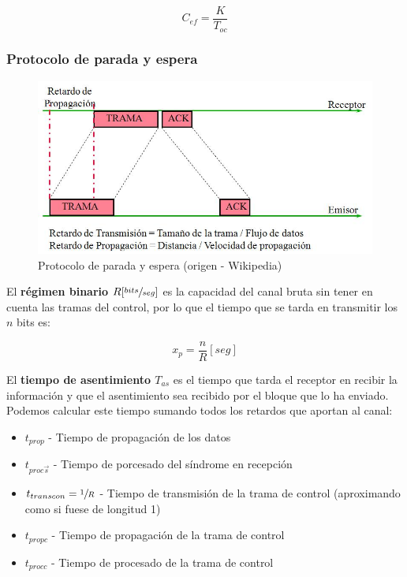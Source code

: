 \documentclass{article}
\begin{document}
\begin{equation}
    C_{ef} = \frac{K}{T_{oc}}
\end{equation}

\subsubsection{Protocolo de parada y espera}


\begin{figure}[h]
    \includegraphics[width=\textwidth]{img/pe.jpeg}
    \caption{Protocolo de parada y espera (origen - Wikipedia)}
\end{figure}


El \textbf{régimen binario $R [\sfrac{bits}{seg}]$} es la capacidad del canal bruta sin tener en cuenta las tramas del control, por lo que el tiempo que se tarda en transmitir los $n$ bits es:

\begin{equation}
    x_p = \frac{n}{R} [seg]
\end{equation}

El \textbf{tiempo de asentimiento $T_{as}$} es el tiempo que tarda el receptor en recibir la información y que el asentimiento sea recibido por el bloque que lo ha enviado. Podemos calcular este tiempo sumando todos los retardos que aportan al canal:

\begin{itemize}
    \item $t_{prop}$ - Tiempo de propagación de los datos
    \item $t_{proc \vec{s}}$ - Tiempo de porcesado del síndrome en recepción
    \item $t_{trans con} = \sfrac{1}{R}$ - Tiempo de transmisión de la trama de control (aproximando como si fuese de longitud 1)
    \item $t_{prop c}$ - Tiempo de propagación de la trama de control
    \item $t_{proc c}$ - Tiempo de procesado de la trama de control
\end{itemize}
\end{document}
